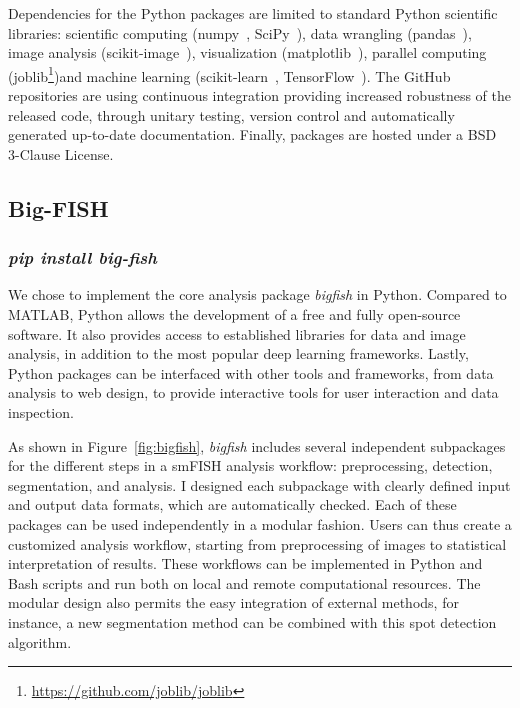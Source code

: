 Dependencies for the Python packages are limited to standard Python scientific libraries: scientific computing (numpy~\cite{2020NumPy}, SciPy~\cite{2020SciPy}), data wrangling (pandas~\cite{mckinney_pandas_2010}), image analysis (scikit-image~\cite{walt_scikit-image_2014}), visualization (matplotlib~\cite{hunter_matplotlib_2007}), parallel computing (joblib\footnote{\url{https://github.com/joblib/joblib}})and machine learning (scikit-learn~\cite{scikit-learn}, TensorFlow~\cite{tensorflow_2015}).
The GitHub repositories are using continuous integration providing increased robustness of the released code, through unitary testing, version control and automatically generated up-to-date documentation.
Finally, packages are hosted under a BSD 3-Clause License.

\subsection{Big-FISH}
\label{subsec:bigfish}

\subsubsection{\emph{pip install big-fish}}

We chose to implement the core analysis package \emph{bigfish} in Python.
Compared to MATLAB, Python allows the development of a free and fully open-source software.
It also provides access to established libraries for data and image analysis, in addition to the most popular deep learning frameworks.
Lastly, Python packages can be interfaced with other tools and frameworks, from data analysis to web design, to provide interactive tools for user interaction and data inspection.

As shown in Figure~\ref{fig:bigfish}, \emph{bigfish} includes several independent subpackages for the different steps in a \ac{smFISH} analysis workflow: preprocessing, detection, segmentation, and analysis.
I designed each subpackage with clearly defined input and output data formats, which are automatically checked.
Each of these packages can be used independently in a modular fashion.
Users can thus create a customized analysis workflow, starting from preprocessing of images to statistical interpretation of results.
These workflows can be implemented in Python and Bash scripts and run both on local and remote computational resources.
The modular design also permits the easy integration of external methods, for instance, a new segmentation method can be combined with this spot detection algorithm.

